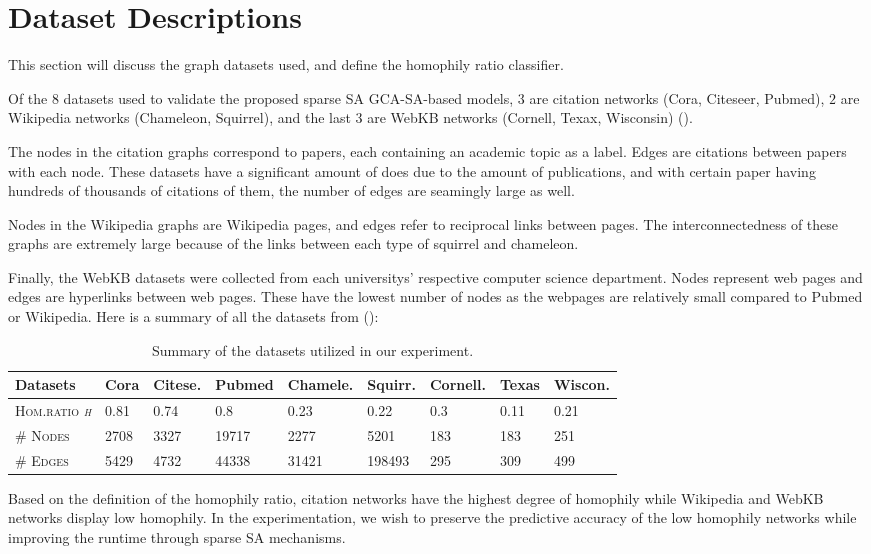 \section{Dataset Descriptions} \label{app:info}
This section will discuss the graph
datasets used, and define the homophily ratio classifier.

Of the $ 8 $ datasets used to validate the
proposed sparse SA \textsc{GCA-SA}-based models,
$ 3 $ are citation networks (Cora, Citeseer, Pubmed), 
$ 2 $ are Wikipedia
networks (Chameleon, Squirrel), 
and the last $ 3 $ are 
WebKB networks (Cornell, Texax, Wisconsin) (\cite{jiang2024self}).

The nodes in the citation graphs correspond to papers, each
containing an academic topic as a label. Edges are citations between
papers with each node. These datasets have a significant amount of 
does due to the amount of publications, and with certain paper
having hundreds of thousands of citations of them, the number 
of edges are seamingly large as well.

Nodes in the Wikipedia graphs are Wikipedia pages,
and edges refer to reciprocal links between pages. 
The interconnectedness of these graphs are extremely 
large because of the links between each type of squirrel
and chameleon.  

Finally, the WebKB datasets were collected
from each universitys' respective computer science
department. Nodes represent web pages and edges
are hyperlinks between web pages. These have the lowest
number of nodes as the webpages are relatively small
compared to Pubmed or Wikipedia. Here is a summary of all
the datasets from (\cite{jiang2024self}):


\begin{table}
  \caption{Summary of the datasets utilized in our experiment.}
  \label{tab:sample}
  \centering
  \begin{tabular}{lllllllll}
    \toprule
    \textbf{Datasets} &
    Cora & Citese. & Pubmed & Chamele. & 
    Squirr. & Cornell. & Texas & Wiscon. \\
    \midrule
    \textsc{Hom.ratio \textit{h}} &
    0.81 & 0.74 & 0.8 & 0.23 &
    0.22 & 0.3 & 0.11 & 0.21 \\
    \textsc{\# Nodes} &
    2708 & 3327 & 19717 & 2277 &
    5201 & 183 & 183 & 251 \\
    \textsc{\# Edges} &
    5429 & 4732 & 44338 & 31421 &
    198493 & 295 & 309 & 499 \\
    \bottomrule
  \end{tabular}
\end{table}

Based on the definition of the homophily ratio, citation networks
have the highest degree of homophily while 
Wikipedia and WebKB networks display low homophily. 
In the experimentation, we wish to preserve the predictive
accuracy of the low homophily networks while improving
the runtime through sparse SA mechanisms. 

